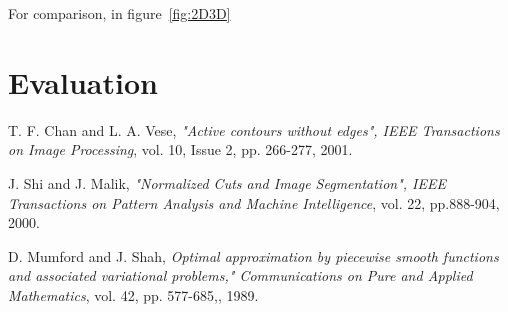 \documentclass{article}
\begin{document}
  For comparison, in figure~\ref{fig:2D3D} 
  
  \section{Evaluation}
  
  
  \begin{thebibliography}{9}
    
    \bibitem{[ChanVese01]}
    T. F. Chan and L. A. Vese,
    \emph{"Active contours without edges", IEEE Transactions on Image Processing},
    vol. 10, Issue 2, pp. 266-277, 2001.
    
    
    \bibitem{[ShiMalik00]}
    J.  Shi  and  J.  Malik,
    \emph{"Normalized Cuts and Image Segmentation", IEEE Transactions on Pattern Analysis and Machine Intelligence},
    vol. 22, pp.888-904,
    2000.
    
    \bibitem{[MumfordShah89]}
    D. Mumford and J. Shah,
    \emph{Optimal approximation by piecewise smooth functions and associated
      variational problems," Communications on Pure and Applied Mathematics},
    vol. 42, pp. 577-685,,
    1989.
    
  \end{thebibliography}
  
\end{document}
